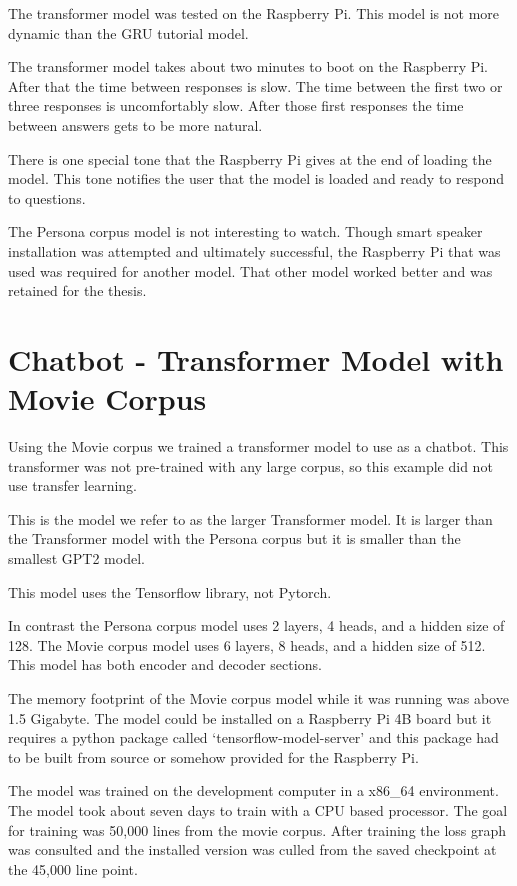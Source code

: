The transformer model was tested on the Raspberry Pi. This model is not more dynamic than the GRU tutorial model. 

The transformer model takes about two minutes to boot on the Raspberry Pi. After that the time between responses is slow. The time between the first two or three responses is uncomfortably slow. After those first responses the time between answers gets to be more natural.

There is one special tone that the Raspberry Pi gives at the end of loading the model. This tone notifies the user that the model is loaded and ready to respond to questions.

The Persona corpus model is not interesting to watch. Though smart speaker installation was attempted and ultimately successful, the Raspberry Pi that was used was required for another model. That other model worked better and was retained for the thesis.

\section{Chatbot - Transformer Model with Movie Corpus}


Using the Movie corpus we trained a transformer model to use as a chatbot. This transformer was not pre-trained with any large corpus, so this example did not use transfer learning. 

This is the model we refer to as the larger Transformer model. It is larger than the Transformer model with the Persona corpus but it is smaller than the smallest GPT2 model.

This model uses the Tensorflow library, not Pytorch. %

In contrast the Persona corpus model uses 2 layers, 4 heads, and a hidden size of 128. The Movie corpus model uses 6 layers, 8 heads, and a hidden size of 512. This model has both encoder and decoder sections.

The memory footprint of the Movie corpus model while it was running was above 1.5 Gigabyte. The model could be installed on a Raspberry Pi 4B board but it requires a python package called `tensorflow-model-server' and this package had to be built from source or somehow provided for the Raspberry Pi. 

The model was trained on the development computer in a x86\_64 environment. The model took about seven days to train with a CPU based processor. The goal for training was 50,000 lines from the movie corpus. After training the loss graph was consulted and the installed version was culled from the saved checkpoint at the 45,000 line point.


